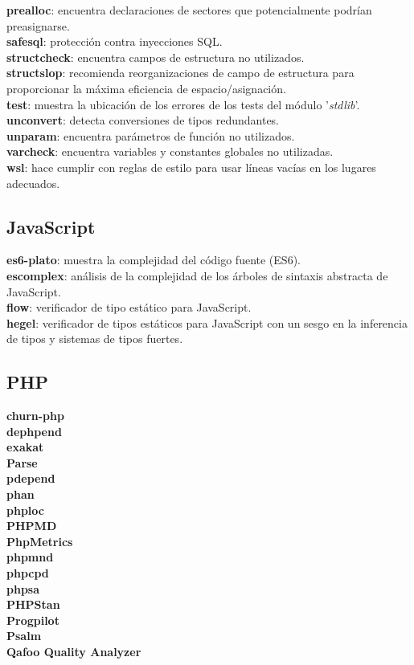 \textbf{prealloc}: encuentra declaraciones de sectores que potencialmente podrían preasignarse.\\
\textbf{safesql}: protección contra inyecciones SQL.\\
\textbf{structcheck}: encuentra campos de estructura no utilizados.\\
\textbf{structslop}: recomienda reorganizaciones de campo de estructura para proporcionar la máxima eficiencia de espacio/asignación.\\
\textbf{test}: muestra la ubicación de los errores de los tests del módulo '\textit{stdlib}'.\\
\textbf{unconvert}: detecta conversiones de tipos redundantes.\\
\textbf{unparam}: encuentra parámetros de función no utilizados.\\
\textbf{varcheck}: encuentra variables y constantes globales no utilizadas.\\
\textbf{wsl}: hace cumplir con reglas de estilo para usar líneas vacías en los lugares adecuados.

\subsection{JavaScript}

\textbf{es6-plato}: muestra la complejidad del código fuente (ES6).\\
\textbf{escomplex}: análisis de la complejidad de los árboles de sintaxis abstracta de JavaScript.\\
\textbf{flow}: verificador de tipo estático para JavaScript.\\
\textbf{hegel}: verificador de tipos estáticos para JavaScript con un sesgo en la inferencia de tipos y sistemas de tipos fuertes.

\pagebreak

\subsection{PHP}

\textbf{churn-php}\\
\textbf{dephpend}\\
\textbf{exakat}\\
\textbf{Parse}\\
\textbf{pdepend}\\
\textbf{phan}\\
\textbf{phploc}\\
\textbf{PHPMD}\\
\textbf{PhpMetrics}\\
\textbf{phpmnd}\\
\textbf{phpcpd}\\
\textbf{phpsa}\\
\textbf{PHPStan}\\
\textbf{Progpilot}\\
\textbf{Psalm}\\
\textbf{Qafoo Quality Analyzer}

